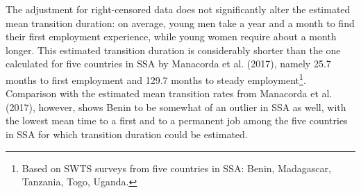 \documentclass[
  11pt,
a4paper
]{article}
\begin{document}
The adjustment for right-censored data does not significantly alter the estimated mean transition duration: on average, young men take a year and a month to find their first employment experience, while young women require about a month longer. This estimated transition duration is considerably shorter than the one calculated for five countries in SSA by Manacorda et al. (2017), namely 25.7 months to first employment and 129.7 months to steady employment\footnote{Based on SWTS surveys from five countries in SSA: Benin, Madagascar, Tanzania, Togo, Uganda.}. Comparison with the estimated mean transition rates from Manacorda et al. (2017), however, shows Benin to be somewhat of an outlier in SSA as well, with the lowest mean time to a first and to a permanent job among the five countries in SSA for which transition duration could be estimated.

\singlespacing
\end{document}
